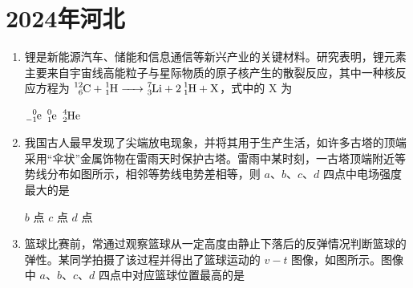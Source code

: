 \documentclass[\gkver]{gaokaozhenti}
\begin{document}
\chapter{2024年河北}

\begin{enumerate}
\item
锂是新能源汽车、储能和信息通信等新兴产业的关键材料。研究表明，锂元素主要来自宇宙线高能粒子与星际物质的原子核产生的散裂反应，其中一种核反应方程为 $\ce{^{12}_{6}C + ^{1}_{1}H -> ^{7}_{3}Li + 2^{1}_{1}H + X}$，式中的 X 为

{$\ce{^{0}_{-1}e}$}
{$\ce{^{0}_{1}e}$}
{$\ce{^{4}_{2}He}$}


\item
我国古人最早发现了尖端放电现象，并将其用于生产生活，如许多古塔的顶端采用“伞状”金属饰物在雷雨天时保护古塔。雷雨中某时刻，一古塔顶端附近等势线分布如图所示，相邻等势线电势差相等，则 $a$、$b$、$c$、$d$ 四点中电场强度最大的是


{$b$ 点}
{$c$ 点}
{$d$ 点}


\item
篮球比赛前，常通过观察篮球从一定高度由静止下落后的反弹情况判断篮球的弹性。某同学拍摄了该过程并得出了篮球运动的 $v - t$ 图像，如图所示。图像中 $a$、$b$、$c$、$d$ 四点中对应篮球位置最高的是


\end{enumerate}
\end{document}
